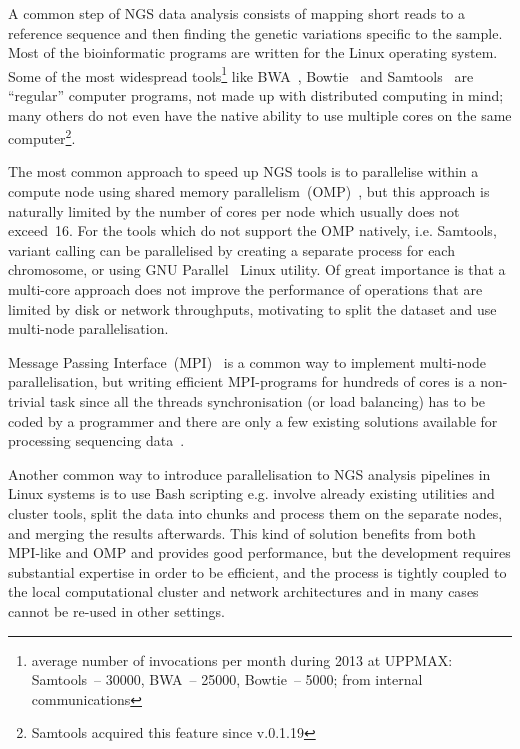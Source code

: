 \documentclass[11pt, oneside]{article}   	%
\begin{document}
A common step of NGS data analysis consists of mapping short reads to a reference sequence and then finding the genetic variations specific to the sample. Most of the bioinformatic programs are written for the Linux operating system. Some of the most widespread tools\footnote{average number of invocations per month during 2013 at UPPMAX: Samtools~-- 30000, BWA~-- 25000, Bowtie~-- 5000; from internal communications} like BWA~\cite{bwa}, Bowtie~\cite{bowtie} and Samtools~\cite{samtools} are ``regular'' computer programs, not made up with distributed computing in mind; many others do not even have the native ability to use multiple cores on the same computer\footnote{Samtools  acquired this feature since v.0.1.19}. 


The most common approach to speed up NGS tools is to parallelise within a compute node using shared memory parallelism~(OMP)~\cite{openmp}, but this approach is naturally limited by the number of cores per node which usually does not exceed~16.  For the tools which do not support the OMP natively, i.e. Samtools, variant calling can be parallelised by creating a separate process  for  each chromosome, or using GNU Parallel~\cite{gnuparallel} Linux utility.
Of great importance is that a multi-core approach does not improve the performance of operations that are limited by disk or network throughputs, motivating to split  the dataset and  use multi-node parallelisation. 

Message Passing Interface~(MPI)~\cite{mpi1} is a common way to implement multi-node parallelisation, but writing efficient MPI-programs for hundreds of cores is a non-trivial task since all the threads synchronisation (or load balancing) has to be coded by a programmer and there are only a few existing solutions available for processing sequencing data~\cite{pmap, erne, gnumap}.

Another common way to introduce parallelisation to NGS analysis pipelines in Linux systems is to use Bash scripting e.g. involve already existing utilities and cluster tools, split the data into chunks and process them on the separate nodes, and merging the results afterwards. This kind of solution benefits from both MPI-like  and OMP and provides good performance, but the development requires substantial expertise in order to be efficient, and the process is tightly coupled to the local computational cluster and network architectures and in many cases cannot be re-used in other settings.
\end{document}
